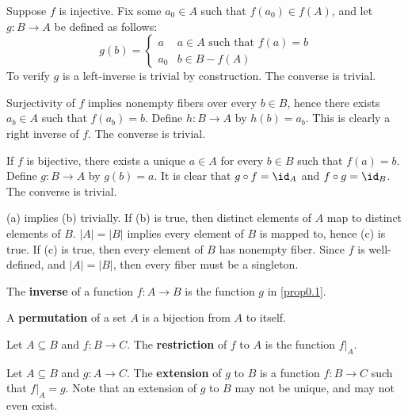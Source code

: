 \begin{proofnum}
    \item Suppose $f$ is injective. Fix some $a_0 \in A$ such that $f(a_0) \in f(A)$, and let $g : B \to A$ be defined as follows:
    \[g(b) =
    \begin{cases}
        a & a \in A \text{ such that } f(a) = b \\
        a_0 & b \in B - f(A)
    \end{cases}\]
    To verify $g$ is a left-inverse is trivial by construction. The converse is trivial.
    \item Surjectivity of $f$ implies nonempty fibers over every $b \in B$, hence there exists $a_b \in A$ such that $f(a_b) = b$. Define $h : B \to A$ by $h(b) = a_b$. This is clearly a right inverse of $f$. The converse is trivial.
    \item If $f$ is bijective, there exists a unique $a \in A$ for every $b \in B$ such that $f(a) = b$. Define $g : B \to A$ by $g(b) = a$. It is clear that $g \circ f = \id_A$ and $f \circ g = \id_B$. The converse is trivial.
    \item (a) implies (b) trivially. If (b) is true, then distinct elements of $A$ map to distinct elements of $B$. $|A| = |B|$ implies every element of $B$ is mapped to, hence (c) is true. If (c) is true, then every element of $B$ has nonempty fiber. Since $f$ is well-defined, and $|A| = |B|$, then every fiber must be a singleton.
\end{proofnum}

 The \textbf{inverse} of a function $f : A \to B$ is the function $g$ in \autoref{prop0.1}.

 A \textbf{permutation} of a set $A$ is a bijection from $A$ to itself.

 Let $A \subseteq B$ and $f : B \to C$. The \textbf{restriction} of $f$ to $A$ is the function $f|_A$.

 Let $A \subseteq B$ and $g : A \to C$. The \textbf{extension} of $g$ to $B$ is a function $f : B \to C$ such that $f|_A = g$. Note that an extension of $g$ to $B$ may not be unique, and may not even exist.


